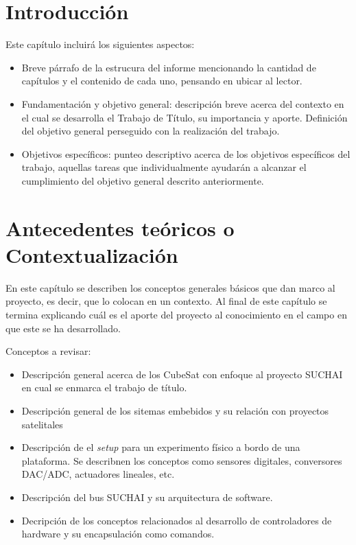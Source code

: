 \documentclass[11pt,letterpaper]{article}
\begin{document}
\section{Introducción}
Este capítulo incluirá los siguientes aspectos:
\begin{itemize}
\item Breve párrafo de la estrucura del informe mencionando la cantidad de capítulos y el contenido de cada uno, pensando en ubicar al lector.
\item Fundamentación y objetivo general: descripción breve acerca del contexto en el cual se desarrolla el Trabajo de Título, su importancia y aporte. Definición del objetivo general perseguido con la realización del trabajo.
\item Objetivos específicos: punteo descriptivo acerca de los objetivos específicos del trabajo, aquellas tareas que individualmente ayudarán a alcanzar el cumplimiento del objetivo general descrito anteriormente.
\end{itemize}

\section{Antecedentes teóricos o Contextualización}
En este capítulo se describen los conceptos generales básicos que dan marco al proyecto, es decir, que lo colocan en un contexto. Al final de este capítulo se termina explicando cuál es el aporte del proyecto al conocimiento en el campo en que este se ha desarrollado.

Conceptos a revisar:
\begin{itemize}
\item Descripción general acerca de los CubeSat con enfoque al proyecto SUCHAI en cual se enmarca el trabajo de título.
\item Descripción general de los sitemas embebidos y su relación con proyectos satelitales
\item Descripción de el \textit{setup} para un experimento físico a bordo de una plataforma. Se describnen los conceptos como sensores digitales, conversores DAC/ADC, actuadores lineales, etc.
\item Descripción del bus SUCHAI y su arquitectura de software.
\item Decripción de los conceptos relacionados al desarrollo de controladores de hardware y su encapsulación como comandos.
\end{itemize}
\end{document}

